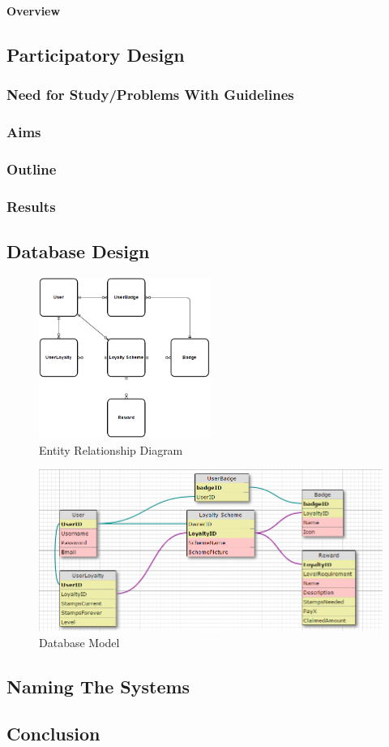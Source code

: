 \textbf{Overview}
\subsection{Participatory Design}
\subsubsection{Need for Study/Problems With Guidelines}
\subsubsection{Aims}
\subsubsection{Outline}
\subsubsection{Results}

\subsection{Database Design}
\begin{figure}[H]
  \centering
    \includegraphics[width=0.5\textwidth]{img/erd.png}
      \caption{Entity Relationship Diagram}
\end{figure}
\begin{figure}[H]
  \centering
    \includegraphics[width=1\textwidth]{img/architecture.png}
      \caption{Database Model}
\end{figure}

\subsection{Naming The Systems}


\subsection{Conclusion}